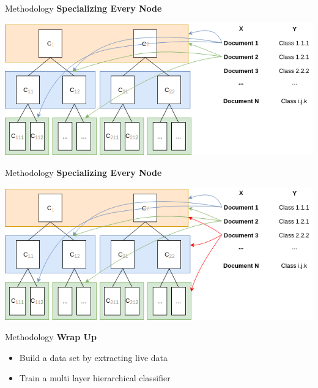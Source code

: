 \begin{frame}[label=metho]{Methodology}
	\textbf{Specializing Every Node}
	
	\includegraphics[width=\textwidth]{images/distribution_2.png}
	
	
\end{frame}


\begin{frame}[label=metho]{Methodology}
	\textbf{Specializing Every Node}
	
	\includegraphics[width=\textwidth]{images/distribution_3.png}
	
\end{frame}


\begin{frame}[label=metho]{Methodology}
	\textbf{Wrap Up}
	
	\begin{itemize}
		\item Build a data set by extracting live data
		\item Train a multi layer hierarchical classifier
	\end{itemize}
	
\end{frame}


